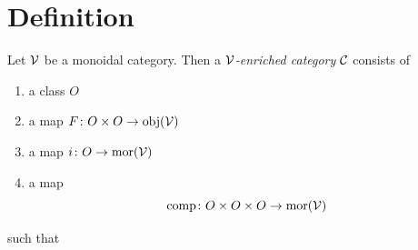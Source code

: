     \section{Definition}\label{chIV-9}
        Let $\mathcal{V}$ be a monoidal category. Then a \emph{$\mathcal{V}$-enriched category} $\mathcal{C}$ consists of
        \begin{enumerate}[label=\roman*)]
            \item 
                a class $O$
            \item 
                a map $F \colon O \times O \to \operatorname{obj}(\mathcal{V})$
            \item 
                a map $i \colon O \to \operatorname{mor}(\mathcal{V})$
            \item 
                a map
                \begin{equation*}
                    \operatorname{comp} \colon O \times  O \times O \to \operatorname{mor}(\mathcal{V})
                \end{equation*}
        \end{enumerate}
        such that
